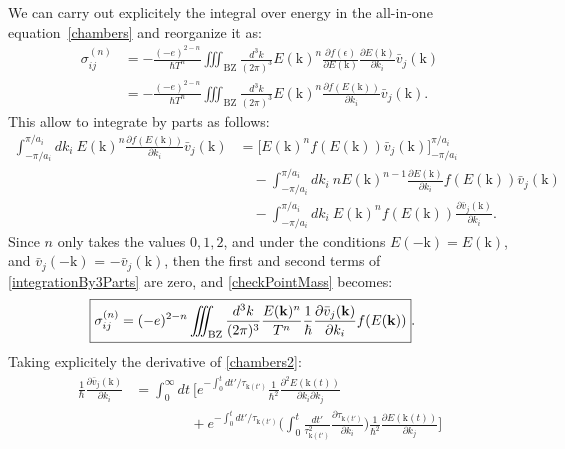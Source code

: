 \documentclass[notitlepage,11pt,nofootinbib]{revtex4-1}
\renewcommand{\vec}[1]{\bm{\mathrm{#1}}}
\begin{document}
We can carry out explicitely the integral over energy in the all-in-one equation~\eqref{chambers} and reorganize it as: 
\begin{align}
\sigma_{ij}^{(n)}
&=
-\frac{(-e)^{2-n}}{\hbar T^n}
\iiint_{\text{BZ}}\frac{d^3k}{(2\pi)^3}
E(\vec k)^{n}
\frac{\partial f(\epsilon)}{\partial E(\vec k)}
\frac{\partial E(\vec k)}{\partial k_i}
\bar{v}_j(\vec k)
\\
&=
-\frac{(-e)^{2-n}}{\hbar T^n}
\iiint_{\text{BZ}}\frac{d^3k}{(2\pi)^3}
E(\vec k)^{n}
\frac{\partial f(E(\vec k))}{\partial k_i}
\bar{v}_j(\vec k).
\label{checkPointMass}
\end{align}
This allow to integrate by parts as follows:
\begin{align}
\int_{-\pi/a_i}^{\pi/a_i} dk_i\ 
E(\vec k)^{n}
\frac{\partial
f(E(\vec k))
}{\partial k_i}
\bar{v}_j(\vec k)
&=
\bigg[
E(\vec k)^{n}
f(E(\vec k))
\bar{v}_j(\vec k)
\bigg]_{-\pi/a_i}^{\pi/a_i}
\nonumber\\
&\quad-
\int_{-\pi/a_i}^{\pi/a_i} dk_i\ 
nE(\vec k)^{n-1}
\frac{\partial E(\vec k)}{\partial k_i}
f(E(\vec k))
\bar{v}_j(\vec k)
\nonumber\\
&\quad-
\int_{-\pi/a_i}^{\pi/a_i} dk_i\ 
E(\vec k)^{n}
f(E(\vec k))
\frac{\partial\bar{v}_j(\vec k)}{\partial k_i}.
\label{integrationBy3Parts}
\end{align}
Since $n$ only takes the values $0,1,2$, and under the conditions $E(-\vec k)=E(\vec k)$,
and $\bar{v}_j(-\vec k)$ = $-\bar{v}_j(\vec k)$, then the first and second terms of \eqref{integrationBy3Parts} are zero, and \eqref{checkPointMass} becomes:
\begin{align}
\Aboxed{
\sigma_{ij}^{(n)}
&=
(-e)^{2-n}
\iiint_{\text{BZ}}\frac{d^3k}{(2\pi)^3}
\frac{E(\vec k)^{n}}{T^n}
\frac{1}{\hbar}
\frac{\partial\bar{v}_j(\vec k)}{\partial k_i}
f(E(\vec k))
}.
\end{align}
Taking explicitely the derivative of \eqref{chambers2}:
\begin{align}
\frac{1}{\hbar}\frac{\partial\bar{v}_j(\vec k)}{\partial k_i}
&=
\int_{0}^{\infty}dt\ 
\bigg[
e^{-\int_{0}^{t}dt'/\tau_{\vec k(t')}}
\frac{1}{\hbar^2}\frac{\partial^2 E(\vec k(t))}{\partial k_i\partial k_j}
\nonumber\\
&\qquad\qquad+
e^{-\int_{0}^{t}dt'/\tau_{\vec k(t')}}
\Big(
\int_{0}^{t}\frac{dt'}{\tau_{\vec k(t')}^2}
\frac{\partial\tau_{\vec k(t')}}{\partial k_i}
\Big)
\frac{1}{\hbar^2}\frac{\partial E(\vec k(t))}{\partial k_j}
\bigg]
\label{eq_velocity_derivative}
\end{align}
\end{document}
